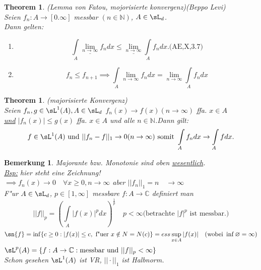 \documentclass[a4paper,11pt]{book}
\newcommand{\C}{{\mathbb C}}
\newcommand{\N}{{\mathbb N}}
\def\folgt{\ensuremath{\implies}}
\newtheorem{Theo}[Def]{Theorem}
\newtheorem*{BemNO}{Bemerkung}
\theoremstyle{nonumberplain}
\begin{document}
\begin{Theo}(Lemma von Fatou, mojorisierte konvergenz)(Beppo Levi)\\
Seien $f_{n}:A\rightarrow [0.\infty]$ messbar $(n\in \N)$, $A\in\sL_{d}$.\\
Dann gelten:
\begin{enumerate}
\item [a)]
\begin{displaymath}
\int\limits_{A} \underline{\lim_{n\rightarrow \infty}} f_{n}dx \leq \underline{\lim_{n\rightarrow \infty}} \int\limits_{A} f_{n} dx. \textrm{(AE,X,3.7)}
\end{displaymath}
\item [b)]
\begin{displaymath}
f_{n} \leq f_{n+1} \folgt \int\limits_{A} \lim_{n\rightarrow \infty}f_{n}dx=\lim_{n\rightarrow \infty} \int\limits_{A} f_{n}dx
\end{displaymath}
\end{enumerate}
\end{Theo}
\begin{Theo}(majorisierte Konvergenz)\\
Seien $f_{n},g \in \sL^{1}(A), A\in \sL_{d}$ $f_{n}(x)\rightarrow f(x) (n\rightarrow \infty)$ ffa. $x\in A$\\
 \underline{und} $ |f_{n}(x)|\leq g(x)$ ffa.
$x\in A$ und alle $n\in \N$.Dann gilt:
\begin{displaymath}
f\in \sL^{1}(A) \textrm{ und } ||f_{n}-f||_{1} \rightarrow 0 (n\rightarrow \infty)\\
\textrm{ somit } \int\limits_{A} f_{n}dx \rightarrow \int\limits_{A} fdx.
\end{displaymath}
\end{Theo}
\begin{BemNO}Majorante bzw. Monotonie sind oben \underline{wesentlich}.\\
\underline{Bsp:} hier steht eine Zeichnung!\\
$\folgt f_{n}(x) \rightarrow 0 \quad\forall x\geq 0, n\rightarrow \infty$ aber 
$||f_{n}||_{1} = n \quad\rightarrow\infty$\\
F"ur $A\in\sL_{d}$, $p\in[1,\infty]$ messbare $f:A\rightarrow \C$ definiert man
\begin{displaymath}
||f||_{p} = (\int\limits_{A}|f(x)|^{p}dx)^{\frac{1}{p}} \quad p<\infty \textrm{(betrachte $|f|^{p}$ ist messbar.)}
\end{displaymath}
\begin{displaymath}
\sn{f}=\inf\{c\geq 0: |f(x)| \leq c,\textrm{ f"uer }x\notin N=N(c)\}= ess \sup_{x\in A} |f(x)| \quad (\textrm{wobei } \inf \varnothing = \infty )
\end{displaymath}
$\sL^{p}(A) = \{f:A\rightarrow \C : \textrm{messbar und }  ||f||_{p} <\infty \}$\\
Schon gesehen $\sL^{1}(A)$ ist VR, $||\cdot||_{1}$ ist Halbnorm.
\end{BemNO}
\end{document}

